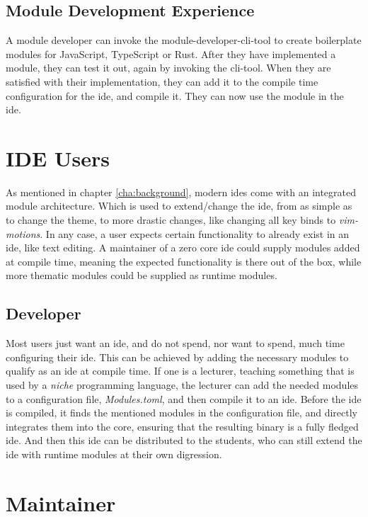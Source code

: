 \subsection{Module Development Experience}

A module developer can invoke the module-developer-\gls{cli}-tool to create
boilerplate modules for JavaScript, TypeScript or Rust. After they have
implemented a module, they can test it out, again by invoking the
\gls{cli}-tool. When they are satisfied with their implementation, they can add
it to the compile time configuration for the \gls{ide}, and compile it. They
can now use the module in the \gls{ide}.

\section{IDE Users}

As mentioned in chapter \ref{cha:background}, modern \gls{ide}s come with an
integrated module architecture. Which is used to extend/change the \gls{ide},
from as simple as to change the theme, to more drastic changes, like changing
all key binds to \textit{vim-motions}. In any case, a user expects certain
functionality to already exist in an \gls{ide}, like text editing. A maintainer
of a zero core \gls{ide} could supply modules added at compile time, meaning the
expected functionality is there out of the box, while more thematic modules
could be supplied as runtime modules.


\subsection{Developer}

Most users just want an \gls{ide}, and do not spend, nor want to spend, much
time configuring their \gls{ide}. This can be achieved by adding the necessary
modules to qualify as an \gls{ide} at compile time. If one is a lecturer,
teaching something that is used by a \textit{niche} programming language, the
lecturer can add the needed modules to a configuration file,
\textit{Modules.toml}, and then compile it to an \gls{ide}. Before the \gls{ide}
is compiled, it finds the mentioned modules in the configuration file, and
directly integrates them into the core, ensuring that the resulting binary is a
fully fledged \gls{ide}. And then this \gls{ide} can be distributed to the
students, who can still extend the \gls{ide} with runtime modules at their own
digression.

\section{Maintainer}

